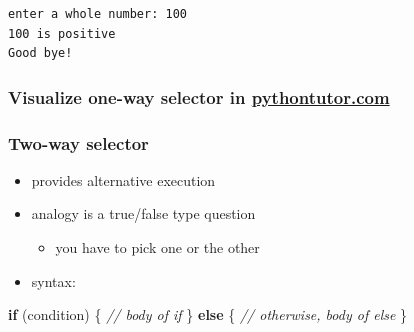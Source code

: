 \documentclass[11pt]{article}
\providecommand{\tightlist}{%
      \setlength{\itemsep}{0pt}\setlength{\parskip}{0pt}}
\newenvironment{Shaded}{}{}
\newcommand{\CommentTok}[1]{\textcolor[rgb]{0.38,0.63,0.69}{\textit{{#1}}}}
\newcommand{\NormalTok}[1]{{#1}}
\newcommand{\ControlFlowTok}[1]{\textcolor[rgb]{0.00,0.44,0.13}{\textbf{{#1}}}}
\newcommand{\OperatorTok}[1]{\textcolor[rgb]{0.40,0.40,0.40}{{#1}}}
\begin{document}
    \begin{Verbatim}[commandchars=\\\{\}]
enter a whole number: 100
100 is positive
Good bye!
    \end{Verbatim}

    \hypertarget{visualize-one-way-selector-in-pythontutor.com}{%
\subsubsection{\texorpdfstring{Visualize one-way selector in
\href{http://pythontutor.com/cpp.html\#code=\%23include\%20\%3Ciostream\%3E\%0Ausing\%20namespace\%20std\%3B\%0A\%0Aint\%20main\%28\%29\%20\%7B\%0A\%20\%20int\%20num\%20\%3D\%20-9\%3B\%0A\%20\%20if\%20\%28num\%20\%3E\%200\%29\%20\%7B\%0A\%20\%20\%20\%20cout\%20\%3C\%3C\%20num\%20\%3C\%3C\%20\%22\%20is\%20positive\%5Cn\%22\%3B\%0A\%20\%20\%7D\%0A\%20\%20cout\%20\%3C\%3C\%20\%22Good\%20bye!\%22\%3B\%0A\%20\%20return\%200\%3B\%0A\%7D\&curInstr=0\&mode=display\&origin=opt-frontend.js\&py=cpp\&rawInputLstJSON=\%5B\%5D}{pythontutor.com}}{Visualize one-way selector in pythontutor.com}}\label{visualize-one-way-selector-in-pythontutor.com}}

\hypertarget{two-way-selector}{%
\subsubsection{Two-way selector}\label{two-way-selector}}

\begin{itemize}
\tightlist
\item
  provides alternative execution
\item
  analogy is a true/false type question

  \begin{itemize}
  \tightlist
  \item
    you have to pick one or the other
  \end{itemize}
\item
  syntax:
\end{itemize}

\begin{Shaded}
\begin{Highlighting}[]
    \ControlFlowTok{if} \OperatorTok{(}\NormalTok{condition}\OperatorTok{)} \OperatorTok{\{}
        \CommentTok{// body of if}
    \OperatorTok{\}}
    \ControlFlowTok{else} \OperatorTok{\{}
        \CommentTok{// otherwise, body of else}
    \OperatorTok{\}}
\end{Highlighting}
\end{Shaded}
\end{document}
